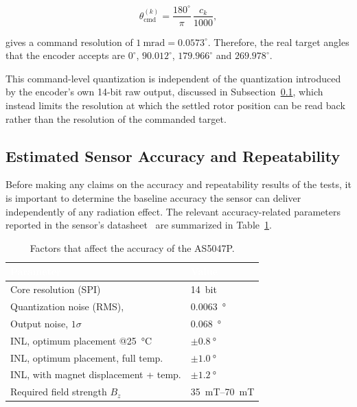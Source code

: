 \begin{equation*}
    \theta_{\mathrm{cmd}}^{(k)} = \frac{180^\circ}{\pi}\,\frac{c_k}{1000},
\end{equation*}

gives a command resolution of $1~\si{\milli\radian} = 0.0573^\circ$. Therefore, the real target angles that the encoder accepts are $0^\circ$, $90.012^\circ$, $179.966^\circ$ and $269.978^\circ$.

This command-level quantization is independent of the quantization introduced by the encoder's own 14-bit raw output, discussed in Subsection~\ref{subsec:expected-accuracy-repeatability}, which instead limits the resolution at which the settled rotor position can be read back rather than the resolution of the commanded target.

\subsection{Estimated Sensor Accuracy and Repeatability}
\label{subsec:expected-accuracy-repeatability}
Before making any claims on the accuracy and repeatability results of the tests, it is important to determine the baseline accuracy the sensor can deliver independently of any radiation effect. The relevant accuracy-related parameters reported in the sensor's datasheet~\cite{as5047p_datasheet} are summarized in Table~\ref{tab:as5047p-specs}.

\begin{table}[H]
    \centering
    \renewcommand{\arraystretch}{1.25}
    \setlength{\tabcolsep}{8pt}
    \begin{tabular}{
        >{\centering\arraybackslash}m{7.5cm}
        >{\centering\arraybackslash}m{4.5cm}
    }
        \rowcolor{thesisblue}
        \textcolor{white}{\textbf{Parameter}} &
        \textcolor{white}{\textbf{Value}} \\
        \hline
        \rowcolor{thesislightgray}
        Core resolution (SPI) &
        \SI{14}{bit} \\
        Quantization noise (RMS), \cite{kester_mt001} &
        \SI{0.0063}{\degree} \\
        \rowcolor{thesislightgray}
        Output noise, $1\sigma$ &
        \SI{0.068}{\degree} \\
        INL, optimum placement @\SI{25}{\celsius} &
        $\pm\SI{0.8}{\degree}$ \\
        \rowcolor{thesislightgray}
        INL, optimum placement, full temp. &
        $\pm\SI{1.0}{\degree}$ \\
        INL, with magnet displacement + temp. &
        $\pm\SI{1.2}{\degree}$ \\
        \rowcolor{thesislightgray}
        Required field strength $B_z$ &
        \SIrange{35}{70}{\milli\tesla} \\
        \hline
    \end{tabular}
    \caption{Factors that affect the accuracy of the AS5047P.}
    \label{tab:as5047p-specs}
\end{table}

